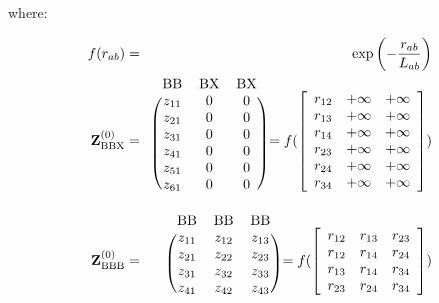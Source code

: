\documentclass{article}
\begin{document}
\noindent where:

\begin{eqnarray}
f(r_{ab}) & = & \exp{\left( -\frac{r_{ab}}{L_{ab}} \right)} \\
\mathbf{Z}^{(0)}_{\mathrm{BBX}} & = & \begin{blockarray}{ccc}
  \mathrm{BB} & \mathrm{BX} & \mathrm{BX} \\
\begin{block}{(ccc)}
	z_{11} & 0        & 0        \\
	z_{21} & 0        & 0        \\
	z_{31} & 0        & 0        \\
	z_{41} & 0        & 0        \\
	z_{51} & 0        & 0        \\
	z_{61} & 0        & 0        \\
\end{block}
\end{blockarray} = 
f(\left[\begin{array}{ccc}
	r_{12} & +\infty  & +\infty  \\
	r_{13} & +\infty  & +\infty  \\
	r_{14} & +\infty  & +\infty  \\
	r_{23} & +\infty  & +\infty  \\
	r_{24} & +\infty  & +\infty  \\
	r_{34} & +\infty  & +\infty  \\
\end{array}
\right]) \\
\mathbf{Z}^{(0)}_{\mathrm{BBB}} & = & \begin{blockarray}{ccc}
\mathrm{BB} & \mathrm{BB} & \mathrm{BB} \\ 
\begin{block}{(ccc)}
	z_{11} & z_{12}   & z_{13}   \\
	z_{21} & z_{22}   & z_{23}   \\
	z_{31} & z_{32}   & z_{33}   \\
	z_{41} & z_{42}   & z_{43}   \\
\end{block}
\end{blockarray} =
f(\left[\begin{array}{ccc}
	r_{12} & r_{13}   & r_{23}   \\
	r_{12} & r_{14}   & r_{24}   \\
	r_{13} & r_{14}   & r_{34}   \\
	r_{23} & r_{24}   & r_{34}   \\
\end{array}
\right])
\end{eqnarray}
\end{document}
